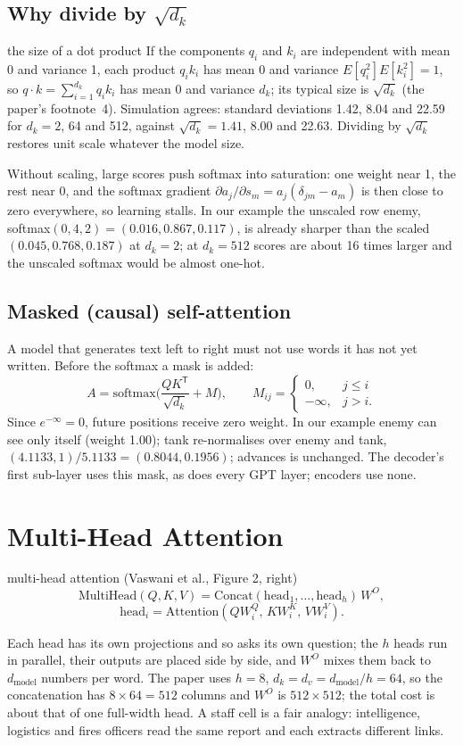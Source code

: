 \documentclass[11pt]{article}
\begin{document}
\subsection{Why divide by $\sqrt{d_k}$}
\begin{derivation}{the size of a dot product}
If the components $q_i$ and $k_i$ are independent with mean 0 and variance 1, each product $q_ik_i$ has mean 0 and variance $E[q_i^2]E[k_i^2]=1$, so $q\cdot k=\sum_{i=1}^{d_k}q_ik_i$ has mean 0 and variance $d_k$; its typical size is $\sqrt{d_k}$ (the paper's footnote~4). Simulation agrees: standard deviations 1.42, 8.04 and 22.59 for $d_k=2$, 64 and 512, against $\sqrt{d_k}=1.41$, 8.00 and 22.63. Dividing by $\sqrt{d_k}$ restores unit scale whatever the model size.
\end{derivation}
Without scaling, large scores push softmax into saturation: one weight near 1, the rest near 0, and the softmax gradient $\partial a_j/\partial s_m=a_j(\delta_{jm}-a_m)$ is then close to zero everywhere, so learning stalls. In our example the unscaled row enemy, softmax$(0,4,2)=(0.016,0.867,0.117)$, is already sharper than the scaled $(0.045,0.768,0.187)$ at $d_k=2$; at $d_k=512$ scores are about 16 times larger and the unscaled softmax would be almost one-hot.

\subsection{Masked (causal) self-attention}
A model that generates text left to right must not use words it has not yet written. Before the softmax a mask is added:
\[A=\text{softmax}\!\Big(\frac{QK^{\mathsf T}}{\sqrt{d_k}}+M\Big),\qquad M_{ij}=\begin{cases}0,&j\le i\\-\infty,&j>i.\end{cases}\]
Since $e^{-\infty}=0$, future positions receive zero weight. In our example enemy can see only itself (weight 1.00); tank re-normalises over enemy and tank, $(4.1133,1)/5.1133=(0.8044,0.1956)$; advances is unchanged. The decoder's first sub-layer uses this mask, as does every GPT layer; encoders use none.

\section{Multi-Head Attention}
\begin{definition}{multi-head attention (Vaswani et al., Figure 2, right)}
\[\text{MultiHead}(Q,K,V)=\text{Concat}(\text{head}_1,\dots,\text{head}_h)\,W^O,\]\[\text{head}_i=\text{Attention}(QW_i^Q,\,KW_i^K,\,VW_i^V).\]
\end{definition}
Each head has its own projections and so asks its own question; the $h$ heads run in parallel, their outputs are placed side by side, and $W^O$ mixes them back to $d_{\text{model}}$ numbers per word. The paper uses $h=8$, $d_k=d_v=d_{\text{model}}/h=64$, so the concatenation has $8\times64=512$ columns and $W^O$ is $512\times512$; the total cost is about that of one full-width head. A staff cell is a fair analogy: intelligence, logistics and fires officers read the same report and each extracts different links.
\end{document}
